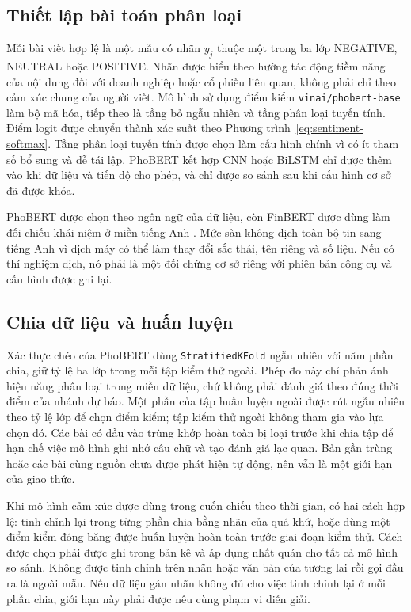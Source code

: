 \subsection{Thiết lập bài toán phân loại}

Mỗi bài viết hợp lệ là một mẫu có nhãn $y_j$ thuộc một trong ba lớp NEGATIVE, NEUTRAL
hoặc POSITIVE. Nhãn được hiểu theo hướng tác động tiềm năng của nội dung đối với doanh
nghiệp hoặc cổ phiếu liên quan, không phải chỉ theo cảm xúc chung của người viết. Mô
hình sử dụng điểm kiểm \texttt{vinai/phobert-base} làm bộ mã hóa, tiếp theo là tầng bỏ
ngẫu nhiên và tầng phân loại tuyến tính. Điểm logit được chuyển thành xác suất theo
Phương trình~\ref{eq:sentiment-softmax}. Tầng phân loại tuyến tính được chọn làm cấu
hình chính vì có ít tham số bổ sung và dễ tái lập. PhoBERT kết hợp CNN hoặc BiLSTM chỉ
được thêm vào khi dữ liệu và tiến độ cho phép, và chỉ được so sánh sau khi cấu hình cơ
sở đã được khóa.

PhoBERT được chọn theo ngôn ngữ của dữ liệu, còn FinBERT được dùng làm đối chiếu khái
niệm ở miền tiếng Anh \cite{Nguyen2020_200300744v3,Yang2020_200608097v2}. Mức sàn
không dịch toàn bộ tin sang tiếng Anh vì dịch máy có thể làm thay đổi sắc thái, tên
riêng và số liệu. Nếu có thí nghiệm dịch, nó phải là một đối chứng cơ sở riêng với
phiên bản công cụ và cấu hình được ghi lại.

\subsection{Chia dữ liệu và huấn luyện}

Xác thực chéo của PhoBERT dùng \texttt{StratifiedKFold} ngẫu nhiên với năm phần chia,
giữ tỷ lệ ba lớp trong mỗi tập kiểm thử ngoài. Phép đo này chỉ phản ánh hiệu năng
phân loại trong miền dữ liệu, chứ không phải đánh giá theo đúng thời điểm của nhánh dự
báo. Một phần của tập huấn luyện ngoài được rút ngẫu nhiên theo tỷ lệ lớp để chọn
điểm kiểm; tập kiểm thử ngoài không tham gia vào lựa chọn đó. Các bài có đầu vào trùng
khớp hoàn toàn bị loại trước khi chia tập để hạn chế việc mô hình ghi nhớ câu chữ và
tạo đánh giá lạc quan. Bản gần trùng hoặc các bài cùng nguồn chưa được phát hiện tự
động, nên vẫn là một giới hạn của giao thức.

Khi mô hình cảm xúc được dùng trong cuốn chiếu theo thời gian, có hai cách hợp lệ:
tinh chỉnh lại trong từng phần chia bằng nhãn của quá khứ, hoặc dùng một điểm kiểm
đóng băng được huấn luyện hoàn toàn trước giai đoạn kiểm thử. Cách được chọn phải
được ghi trong bản kê và áp dụng nhất quán cho tất cả mô hình so sánh. Không được
tinh chỉnh trên nhãn hoặc văn bản của tương lai rồi gọi đầu ra là ngoài mẫu. Nếu dữ
liệu gán nhãn không đủ cho việc tinh chỉnh lại ở mỗi phần chia, giới hạn này phải
được nêu cùng phạm vi diễn giải.

